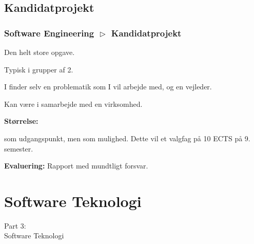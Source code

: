 \subsection{Kandidatprojekt}
\begin{frame}[fragile]
  \frametitle{Software Engineering $\vartriangleright$ Kandidatprojekt}
  \vspace{3mm}
  Den helt store opgave.
  
  \pause
  \vspace{5mm}
  Typisk i grupper af 2.
  
  \pause
  \vspace{5mm}
  I finder selv en problematik som I vil arbejde med, og en vejleder.
  
  \pause
  \vspace{5mm}
  Kan være i samarbejde med en virksomhed.
  
  \pause
  \vspace{5mm}
  \textbf{Størrelse:}
  \begin{itemize}
     som udgangspunkt\pause, men
     som mulighed. Dette vil  et valgfag på 10 ECTS på 9. semester.
  \end{itemize}
  
  \pause
  \vspace{5mm}
  \textbf{Evaluering:} Rapport med mundtligt forsvar.
\end{frame}

\section{Software Teknologi}
\begin{frame}
    \vspace{25mm}
    \begin{center}
        \Huge{Part 3:\\Software Teknologi}
    \end{center}
\end{frame}

